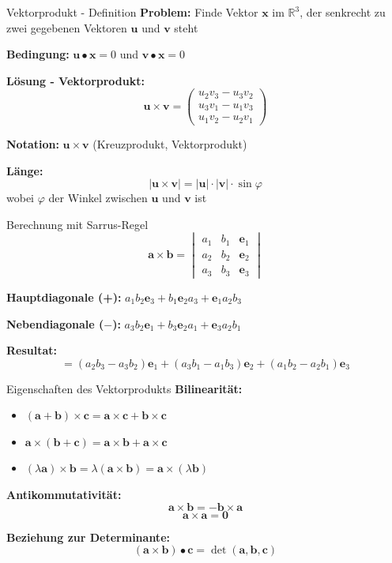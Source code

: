 \documentclass[a4paper, fontsize=7pt]{scrartcl}
\def\R{\mathbb{R}}
\begin{document}
\begin{mainbox}{Vektorprodukt - Definition}
\textbf{Problem:} Finde Vektor $\mathbf{x}$ im $\R^3$, der senkrecht zu zwei gegebenen Vektoren $\mathbf{u}$ und $\mathbf{v}$ steht

\textbf{Bedingung:} $\mathbf{u} \bullet \mathbf{x} = 0$ und $\mathbf{v} \bullet \mathbf{x} = 0$

\textbf{Lösung - Vektorprodukt:}
$$\mathbf{u} \times \mathbf{v} = \begin{pmatrix}
u_2v_3 - u_3v_2 \\
u_3v_1 - u_1v_3 \\
u_1v_2 - u_2v_1
\end{pmatrix}$$

\textbf{Notation:} $\mathbf{u} \times \mathbf{v}$ (Kreuzprodukt, Vektorprodukt)

\textbf{Länge:}
$$|\mathbf{u} \times \mathbf{v}| = |\mathbf{u}| \cdot |\mathbf{v}| \cdot \sin \varphi$$
wobei $\varphi$ der Winkel zwischen $\mathbf{u}$ und $\mathbf{v}$ ist
\end{mainbox}

\begin{mainbox}{Berechnung mit Sarrus-Regel}
$$\mathbf{a} \times \mathbf{b} = \begin{vmatrix}
a_1 & b_1 & \mathbf{e}_1 \\
a_2 & b_2 & \mathbf{e}_2 \\
a_3 & b_3 & \mathbf{e}_3
\end{vmatrix}$$

\textbf{Hauptdiagonale (+):} $a_1b_2\mathbf{e}_3 + b_1\mathbf{e}_2a_3 + \mathbf{e}_1a_2b_3$

\textbf{Nebendiagonale ($-$):} $a_3b_2\mathbf{e}_1 + b_3\mathbf{e}_2a_1 + \mathbf{e}_3a_2b_1$

\textbf{Resultat:}
$$= (a_2b_3 - a_3b_2)\mathbf{e}_1 + (a_3b_1 - a_1b_3)\mathbf{e}_2 + (a_1b_2 - a_2b_1)\mathbf{e}_3$$
\end{mainbox}

\begin{subbox}{Eigenschaften des Vektorprodukts}
\textbf{Bilinearität:}
\begin{itemize}
    \item $(\mathbf{a} + \mathbf{b}) \times \mathbf{c} = \mathbf{a} \times \mathbf{c} + \mathbf{b} \times \mathbf{c}$
    \item $\mathbf{a} \times (\mathbf{b} + \mathbf{c}) = \mathbf{a} \times \mathbf{b} + \mathbf{a} \times \mathbf{c}$
    \item $(\lambda \mathbf{a}) \times \mathbf{b} = \lambda(\mathbf{a} \times \mathbf{b}) = \mathbf{a} \times (\lambda \mathbf{b})$
\end{itemize}

\textbf{Antikommutativität:}
$$\mathbf{a} \times \mathbf{b} = -\mathbf{b} \times \mathbf{a}$$
$$\mathbf{a} \times \mathbf{a} = \mathbf{0}$$

\textbf{Beziehung zur Determinante:}
$$(\mathbf{a} \times \mathbf{b}) \bullet \mathbf{c} = \det(\mathbf{a}, \mathbf{b}, \mathbf{c})$$
\end{subbox}
\end{document}
